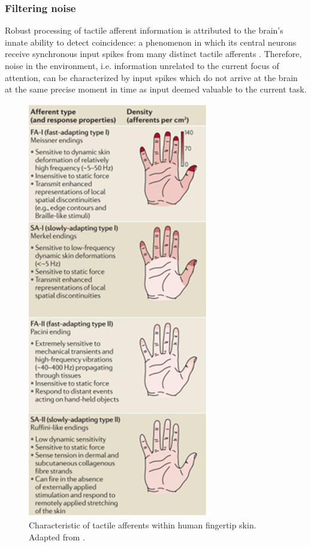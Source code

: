 \subsubsection*{Filtering noise}

Robust processing of tactile afferent information is attributed to the brain's innate ability to detect coincidence: a phenomenon in which its central neurons receive synchronous input spikes from many distinct tactile afferents \cite{hopfield1995pattern}.
Therefore, noise in the environment, i.e. information unrelated to the current focus of attention, can be characterized by input spikes which do not arrive at the brain at the same precise moment in time as input deemed valuable to the current task.

\begin{figure}[hbt]
	\centering
	\includegraphics[width=0.7\textwidth]{images/tactile_afferents}
	\caption{Characteristic of tactile afferents within human fingertip skin.
Adapted from \cite{johansson2001eye}.}
	\label{fig:tactile_afferents}
\end{figure}


